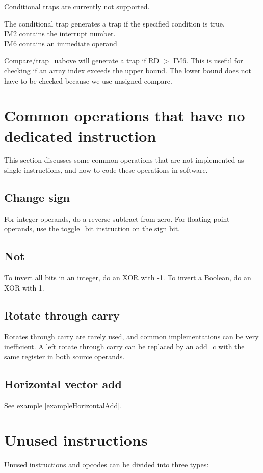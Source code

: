 \documentclass[forwardcom.tex]{subfiles}
\begin{document}
Conditional traps are currently not supported.
\vv

The conditional trap generates a trap if the specified condition is true.\\
IM2 contains the interrupt number. \\
IM6 contains an immediate operand
\vv

Compare/trap\_uabove will generate a trap if RD $>$ IM6. This is useful for checking if an array index exceeds the upper bound. The lower bound does not have to be checked because we use unsigned compare. 
\vv


\section{Common operations that have no dedicated instruction}
This section discusses some common operations that are not implemented as single instructions, and how to code these operations in software.

\subsection{Change sign}
For integer operands, do a reverse subtract from zero. For floating point operands, use the toggle\_bit instruction on the sign bit.

\subsection{Not}
To invert all bits in an integer, do an XOR with -1. To invert a Boolean, do an XOR with 1.

\subsection{Rotate through carry}
Rotates through carry are rarely used, and common implementations can be very inefficient. A left rotate through carry can be replaced by an add\_c with the same register in both source operands.

\subsection{Horizontal vector add} \label{horizontalVectorAdd}
See example \ref{exampleHorizontalAdd}.
\vv

\section{Unused instructions} \label{unusedInstructions}
Unused instructions and opcodes can be divided into three types:
\end{document}

